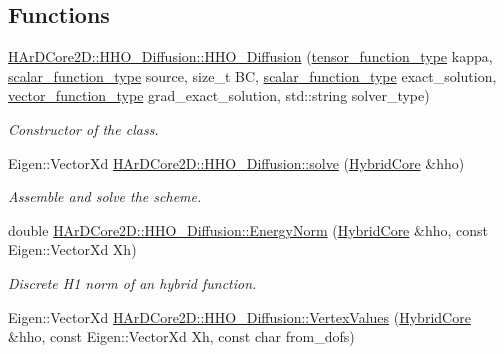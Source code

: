 \subsection*{Functions}
\begin{DoxyCompactItemize}
\item 
\hyperlink{group__HHO__Diffusion_ga32ee13003e4eda510daa25737fa60e47}{H\+Ar\+D\+Core2\+D\+::\+H\+H\+O\+\_\+\+Diffusion\+::\+H\+H\+O\+\_\+\+Diffusion} (\hyperlink{classHArDCore2D_1_1HHO__Diffusion_af2d9bd4031a898a3619812343aa5c2c9}{tensor\+\_\+function\+\_\+type} kappa, \hyperlink{classHArDCore2D_1_1HHO__Diffusion_abe94c05310207687b5f3a4af2ea1c97b}{scalar\+\_\+function\+\_\+type} source, size\+\_\+t BC, \hyperlink{classHArDCore2D_1_1HHO__Diffusion_abe94c05310207687b5f3a4af2ea1c97b}{scalar\+\_\+function\+\_\+type} exact\+\_\+solution, \hyperlink{classHArDCore2D_1_1HHO__Diffusion_adad1657301e86deba6abcb5e7e6048e4}{vector\+\_\+function\+\_\+type} grad\+\_\+exact\+\_\+solution, std\+::string solver\+\_\+type)
\begin{DoxyCompactList}\small\item\em Constructor of the class. \end{DoxyCompactList}\item 
\mbox{\label{group__HHO__Diffusion_ga1aebf22f19de92c115aed69ba394de88}} 
Eigen\+::\+Vector\+Xd \hyperlink{group__HHO__Diffusion_ga1aebf22f19de92c115aed69ba394de88}{H\+Ar\+D\+Core2\+D\+::\+H\+H\+O\+\_\+\+Diffusion\+::solve} (\hyperlink{classHArDCore2D_1_1HybridCore}{Hybrid\+Core} \&hho)
\begin{DoxyCompactList}\small\item\em Assemble and solve the scheme. \end{DoxyCompactList}\item 
\mbox{\label{group__HHO__Diffusion_ga1f21d17ee818df40d6c0081300c44982}} 
double \hyperlink{group__HHO__Diffusion_ga1f21d17ee818df40d6c0081300c44982}{H\+Ar\+D\+Core2\+D\+::\+H\+H\+O\+\_\+\+Diffusion\+::\+Energy\+Norm} (\hyperlink{classHArDCore2D_1_1HybridCore}{Hybrid\+Core} \&hho, const Eigen\+::\+Vector\+Xd Xh)
\begin{DoxyCompactList}\small\item\em Discrete H1 norm of an hybrid function. \end{DoxyCompactList}\item 
Eigen\+::\+Vector\+Xd \hyperlink{group__HHO__Diffusion_ga2b77651b50be012339ca136f4fd90e81}{H\+Ar\+D\+Core2\+D\+::\+H\+H\+O\+\_\+\+Diffusion\+::\+Vertex\+Values} (\hyperlink{classHArDCore2D_1_1HybridCore}{Hybrid\+Core} \&hho, const Eigen\+::\+Vector\+Xd Xh, const char from\+\_\+dofs)

\end{DoxyCompactItemize}

